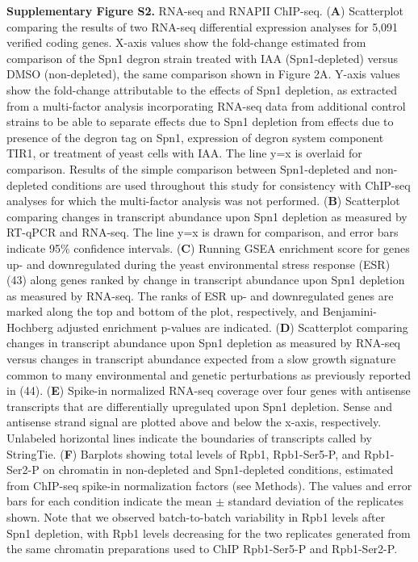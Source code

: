 \documentclass[8pt]{extarticle}
\begin{document}
\vspace{2em}
\textbf{Supplementary Figure S2.} RNA-seq and RNAPII ChIP-seq.
(\textbf{A}) Scatterplot comparing the results of two RNA-seq differential expression analyses for 5,091 verified coding genes.
X-axis values show the fold-change estimated from comparison of the Spn1 degron strain treated with IAA (Spn1-depleted) versus DMSO (non-depleted), the same comparison shown in Figure 2A.
Y-axis values show the fold-change attributable to the effects of Spn1 depletion, as extracted from a multi-factor analysis incorporating RNA-seq data from additional control strains to be able to separate effects due to Spn1 depletion from effects due to presence of the degron tag on Spn1, expression of degron system component TIR1, or treatment of yeast cells with IAA.
The line y=x is overlaid for comparison.
Results of the simple comparison between Spn1-depleted and non-depleted conditions are used throughout this study for consistency with ChIP-seq analyses for which the multi-factor analysis was not performed.
(\textbf{B}) Scatterplot comparing changes in transcript abundance upon Spn1 depletion as measured by RT-qPCR and RNA-seq. The line y=x is drawn for comparison, and error bars indicate 95\% confidence intervals.
(\textbf{C}) Running GSEA enrichment score for genes up- and downregulated during the yeast environmental stress response (ESR) (43) along genes ranked by change in transcript abundance upon Spn1 depletion as measured by RNA-seq.
The ranks of ESR up- and downregulated genes are marked along the top and bottom of the plot, respectively, and Benjamini-Hochberg adjusted enrichment p-values are indicated.
(\textbf{D}) Scatterplot comparing changes in transcript abundance upon Spn1 depletion as measured by RNA-seq versus changes in transcript abundance expected from a slow growth signature common to many environmental and genetic perturbations as previously reported in (44).
(\textbf{E}) Spike-in normalized RNA-seq coverage over four genes with antisense transcripts that are differentially upregulated upon Spn1 depletion.
Sense and antisense strand signal are plotted above and below the x-axis, respectively.
Unlabeled horizontal lines indicate the boundaries of transcripts called by StringTie.
(\textbf{F}) Barplots showing total levels of Rpb1, Rpb1-Ser5-P, and Rpb1-Ser2-P on chromatin in non-depleted and Spn1-depleted conditions, estimated from ChIP-seq spike-in normalization factors (see Methods).
The values and error bars for each condition indicate the mean $\pm$ standard deviation of the replicates shown.
Note that we observed batch-to-batch variability in Rpb1 levels after Spn1 depletion, with Rpb1 levels decreasing for the two replicates generated from the same chromatin preparations used to ChIP Rpb1-Ser5-P and Rpb1-Ser2-P.
\end{document}
